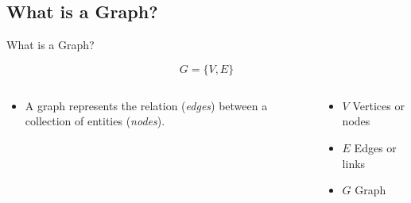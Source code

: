 \documentclass[
    11pt, %
    aspectratio=169, %
]{beamer}
\begin{document}
\subsection{What is a Graph?}
\begin{frame}{What is a Graph?}
    \begin{block}{}
        \begin{equation*}
            G = \{V, E\}
        \end{equation*}     
    \end{block}

    \begin{columns}
        \begin{column}{.55\textwidth}
            \begin{itemize}
                \item A graph represents the relation (\textit{edges}) between a collection of entities (\textit{nodes}).
            \end{itemize}
        \end{column}
        
        \begin{column}{.45\textwidth}
            \begin{itemize}
                \item $V$ Vertices or nodes
                \item $E$ Edges or links
                \item $G$ Graph
            \end{itemize}
        \end{column}
    \end{columns}
\end{frame}
\end{document}
